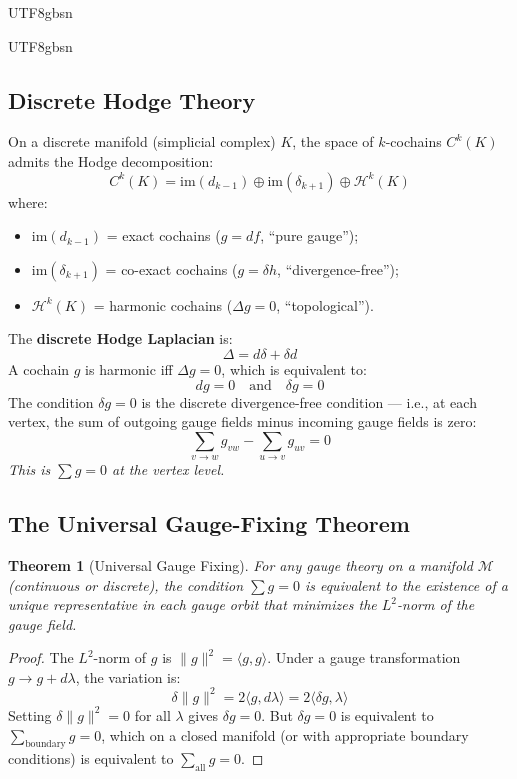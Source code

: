\documentclass[11pt,a4paper]{article}
\newtheorem{theorem}{Theorem}[section]
\newcommand{\Manifold}{\mathcal{M}}
\begin{document}
\begin{CJK}{UTF8}{gbsn}
{\begin{CJK}{UTF8}{gbsn}
\subsection{Discrete Hodge Theory}
On a discrete manifold (simplicial complex) $K$, the space of $k$-cochains $C^k(K)$
admits the Hodge decomposition:
\begin{equation}
    C^k(K) = \mathrm{im}(d_{k-1}) \oplus \mathrm{im}(\delta_{k+1}) \oplus \mathcal{H}^k(K)
\end{equation}
where:
\begin{itemize}
    \item $\mathrm{im}(d_{k-1})$ = exact cochains ($g = df$, ``pure gauge'');
    \item $\mathrm{im}(\delta_{k+1})$ = co-exact cochains ($g = \delta h$, ``divergence-free'');
    \item $\mathcal{H}^k(K)$ = harmonic cochains ($\Delta g = 0$, ``topological'').
\end{itemize}
The \textbf{discrete Hodge Laplacian} is:
\begin{equation}
    \Delta = d\delta + \delta d
\end{equation}
A cochain $g$ is harmonic iff $\Delta g = 0$, which is equivalent to:
\begin{equation}
    dg = 0 \quad \text{and} \quad \delta g = 0
\end{equation}
The condition $\delta g = 0$ is the discrete divergence-free condition --- i.e.,
at each vertex, the sum of outgoing gauge fields minus incoming gauge fields is zero:
\begin{equation}
    \boxed{\sum_{v \to w} g_{vw} - \sum_{u \to v} g_{uv} = 0}
\end{equation}
\textit{This is $\sum g = 0$ at the vertex level.}
\subsection{The Universal Gauge-Fixing Theorem}
\begin{theorem}[Universal Gauge Fixing]
\label{thm:gauge-fix}
For any gauge theory on a manifold $\Manifold$ (continuous or discrete), the condition
$\sum g = 0$ is equivalent to the existence of a unique representative in each
gauge orbit that minimizes the $L^2$-norm of the gauge field.
\end{theorem}
\begin{proof}
The $L^2$-norm of $g$ is $\|g\|^2 = \langle g, g\rangle$. Under a gauge transformation
$g \to g + d\lambda$, the variation is:
\begin{equation}
    \delta\|g\|^2 = 2\langle g, d\lambda\rangle = 2\langle \delta g, \lambda\rangle
\end{equation}
Setting $\delta\|g\|^2 = 0$ for all $\lambda$ gives $\delta g = 0$. But $\delta g = 0$
is equivalent to $\sum_{\text{boundary}} g = 0$, which on a closed manifold (or with
appropriate boundary conditions) is equivalent to $\sum_{\text{all}} g = 0$.
\end{proof}

\end{CJK}}
\end{CJK}
\end{document}
